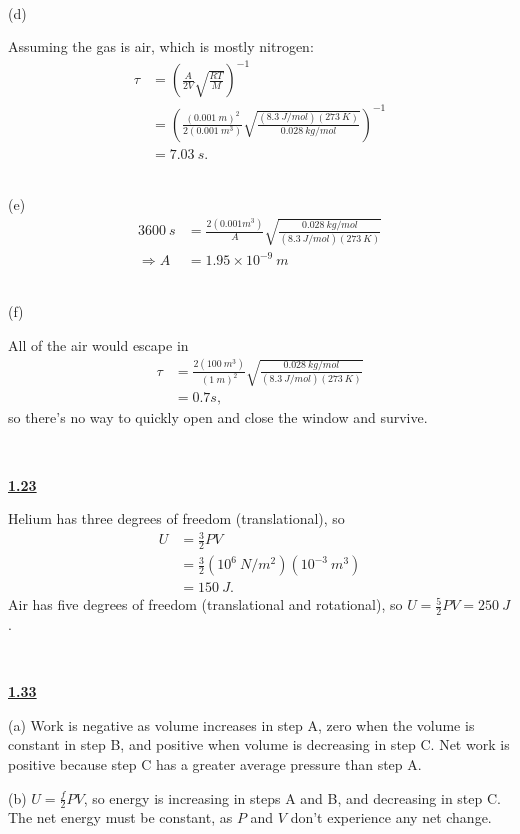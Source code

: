 \documentclass{article}
\begin{document}
\

(d)

Assuming the gas is air, which is mostly nitrogen:
\begin{align*}
\tau  & =\left(\frac{A}{2V}\sqrt{\frac{RT}{M}}\right)^{-1}\\
 & =\left(\frac{( 0.001\ m)^{2}}{2\left( 0.001\ m^{3}\right)}\sqrt{\frac{( 8.3\ J/mol)( 273\ K)}{0.028\ kg/mol}}\right)^{-1}\\
 & =7.03\ s.
\end{align*}
\

(e)
\begin{align*}
3600\ s & =\frac{2\left( 0.001m^{3}\right)}{A}\sqrt{\frac{0.028\ kg/mol}{( 8.3\ J/mol)( 273\ K)}}\\
\Rightarrow A & =1.95\times 10^{-9} \ m
\end{align*}
\

(f)

All of the air would escape in
\begin{align*}
\tau  & =\frac{2\left( 100\ m^{3}\right)}{( 1\ m)^{2}}\sqrt{\frac{0.028\ kg/mol}{( 8.3\ J/mol)( 273\ K)}}\\
 & =0.7s,
\end{align*}
so there's no way to quickly open and close the window and survive.





\

\hline

\textbf{\underline{1.23}}

Helium has three degrees of freedom (translational), so
\begin{align*}
U & =\frac{3}{2} PV\\
 & =\frac{3}{2}\left( 10^{6} \ N/m^{2}\right)\left( 10^{-3} \ m^{3}\right)\\
 & =150\ J.
\end{align*}
Air has five degrees of freedom (translational and rotational), so $U=\frac{5}{2} PV=250\ J$.



\

\hline

\textbf{\underline{1.33}}

(a) Work is negative as volume increases in step A, zero when the volume is constant in step B, and positive when volume is decreasing in step C. Net work is positive because step C has a greater average pressure than step A.

(b) $U=\frac{f}{2} PV$, so energy is increasing in steps A and B, and decreasing in step C. The net energy must be constant, as $P$ and $V$ don't experience any net change.
\end{document}
